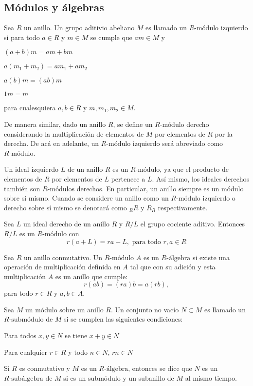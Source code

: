 \subsection{Módulos y álgebras}
\begin{definicion}
Sea $R$ un anillo. Un grupo aditivio abeliano $M$ es llamado un $R\mbox{-módulo}$ izquierdo si para todo $a \in R$ y $m \in M$ se cumple que $am \in M$ y 
\begin{bulletList}
\item $(a+b)m = am  + bm$
\item $a(m_1 + m_2) = am_1 + am_2$
\item $a(b)m = (ab)m$
\item $1m = m$ 
\end{bulletList}
para cualesquiera $a,b \in R$ y $m, m_1, m_2 \in M$.
\end{definicion}
De manera similar, dado un anillo $R$, se define un $R\mbox{-módulo}$ derecho considerando la multiplicación de elementos de $M$ por elementos de $R$ por la derecha. De acá en adelante, un $R\mbox{-módulo}$ izquierdo será abreviado como $R\mbox{-módulo}$. 
\begin{ejemplo}
Un ideal izquierdo $L$ de un anillo $R$ es un $R\mbox{-módulo}$, ya que el producto de elementos de $R$ por elementos de $L$ pertenece a $L$. Así mismo, los ideales derechos también son $R\mbox{-módulos}$ derechos.
En particular, un anillo siempre es un módulo sobre sí mismo. Cuando se considere un anillo como un $R\mbox{-módulo}$ izquierdo o derecho sobre sí mismo se denotará como $_{R}R$ y $R_R$ respectivamente.
\end{ejemplo}
\begin{ejemplo}
Sea $L$ un ideal derecho de un anillo $R$ y $R/L$ el grupo cociente aditivo. Entonces $R/L$ es un $R\mbox{-módulo}$ con \[  r(a+L) = ra +L, \mbox{ para todo } r, a \in R  \]
\end{ejemplo} 
\begin{definicion}
Sea $R$ un anillo conmutativo. Un $R\mbox{-módulo}$ $A$ es un $R\mbox{-álgebra}$ si existe una operación de multiplicación definida en $A$ tal que con su adición y esta multiplicación $A$ es un anillo que cumple: \[ r(ab) = (ra)b = a(rb), \] para todo $r \in R$ y $a,b \in A$.
\end{definicion}
\begin{definicion}
Sea $M$ un módulo sobre un anillo $R$. Un conjunto no vacío $N \subset M$ es llamado un $R\mbox{-submódulo}$ de $M$ si se cumplen las siguientes condiciones:
\begin{bulletList}
\item Para todos $x,y \in N$ se tiene $x + y \in N$
\item Para cualquier $r \in R$ y todo $n \in N$, $rn \in N$
\end{bulletList}
Si $R$ es conmutativo y $M$ es un $R\mbox{-álgebra}$, entonces  se dice que $N$ es un $R\mbox{-subálgebra}$ de $M$ si es un submódulo y un subanillo de $M$ al mismo tiempo. 
\end{definicion}
